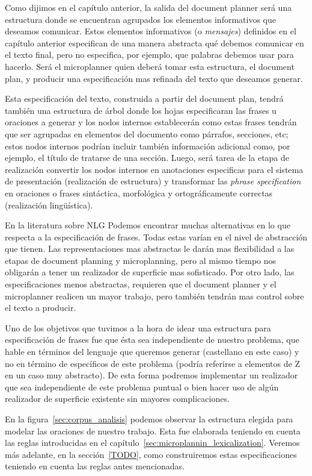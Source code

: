 Como dijimos en el capítulo anterior, la salida del document planner será una estructura donde se encuentran agrupados los elementos informativos que deseamos comunicar. Estos elementos informativos (o \emph{mensajes}) definidos en el capítulo anterior especifican de una manera abstracta qué debemos comunicar en el texto final, pero no especifica, por ejemplo, que palabras debemos usar para hacerlo. Será el microplanner quien deberá tomar esta estructura, el document plan, y producir una especificación mas refinada del texto que deseamos generar.

Esta especificación del texto, construida a partir del document plan, tendrá también una estructura de árbol donde los hojas especificaran las frases u oraciones a generar y los nodos internos establecerán como estas frases tendrán que ser agrupadas en elementos del documento como párrafos, secciones, etc; estos nodos internos podrían incluir también información adicional como, por ejemplo, el título de tratarse de una sección. Luego, será tarea de la etapa de realización convertir los nodos internos en anotaciones especificas para el sistema de presentación (realización de estructura) y transformar las \emph{phrase specification} en oraciones o frases sintáctica, morfológica y ortográficamente correctas (realización lingüística).

En la literatura sobre NLG Podemos encontrar muchas alternativas en lo que respecta a la especificación de frases. Todas estas varían en el nivel de abstracción que tienen. Las representaciones mas abstractas le darán mas flexibilidad a las etapas de document planning y microplanning, pero al mismo tiempo nos obligarán a tener un realizador de superficie mas sofisticado. Por otro lado, las especificaciones menos abstractas, requieren que el document planner y el microplanner realicen un mayor trabajo, pero también tendrán mas control sobre el texto a producir. 

Uno de los objetivos que tuvimos a la hora de idear una estructura para especificación de frases fue que ésta sea independiente de nuestro problema, que hable en términos del lenguaje que queremos generar (castellano en este caso) y no en término de específicos de este problema (podría referirse a elementos de Z en un caso muy abstracto). De esta forma podremos implementar un realizador que sea independiente de este problema puntual o bien hacer uso de algún realizador de superficie existente sin mayores complicaciones.


En la figura~\ref{sec:corpus_analisis} podemos observar la estructura elegida para modelar las oraciones de nuestro trabajo. Esta fue elaborada teniendo en cuenta las reglas introducidas en el capítulo~\ref{sec:microplannin_lexicalization}. Veremos más adelante, en la sección~\ref{TODO}, como construiremos estas especificaciones teniendo en cuenta las reglas antes mencionadas.

